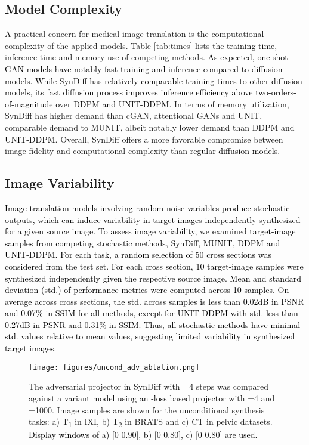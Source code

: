 \documentclass[journal,twoside,web]{ieeecolor}
\def\SB#1{\textsubscript{#1}}
\newcommand*{\revhl}{\textcolor{black}}
\begin{document}
\subsection{Model Complexity}
A practical concern for medical image translation is the computational complexity of the applied models. Table \ref{tab:times} lists the \revhl{training time,} inference time and memory use of competing methods. \revhl{As expected, one-shot GAN models have notably fast training and inference compared to diffusion models. While SynDiff has relatively comparable training times to other diffusion models, its fast diffusion process improves inference efficiency above two-orders-of-magnitude over DDPM and UNIT-DDPM.} In terms of memory utilization, SynDiff has higher demand than cGAN, attentional GANs and UNIT, comparable demand to MUNIT, albeit notably lower demand than DDPM \revhl{and UNIT-DDPM}. Overall, SynDiff offers a more favorable compromise between image fidelity and computational complexity than \revhl{regular diffusion models}.


\subsection{Image Variability}
\revhl{Image translation models involving random noise variables produce stochastic outputs, which can induce variability in target images independently synthesized for a given source image. To assess image variability, we examined target-image samples from competing stochastic methods, SynDiff, MUNIT, DDPM and UNIT-DDPM. For each task, a random selection of 50 cross sections was considered from the test set. For each cross section, 10 target-image samples were synthesized independently given the respective source image. Mean and standard deviation (std.) of performance metrics were computed across 10 samples. On average across cross sections, the std. across samples is less than 0.02dB in PSNR and 0.07\% in SSIM for all methods, except for UNIT-DDPM with std. less than 0.27dB in PSNR and 0.31\% in SSIM. Thus, all stochastic methods have minimal std. values relative to mean values, suggesting limited variability in synthesized target images.}



\begin{figure}[t]
\centering
\texttt{[image: figures/uncond\_adv\_ablation.png]}
\caption{The adversarial projector in SynDiff with =4 steps was compared against a \revhl{variant model using an -loss based projector} with =4 and =1000. Image samples are shown for the unconditional synthesis tasks: a) T\SB{1} in IXI, b) T\SB{2} in BRATS and c) CT in pelvic datasets. \revhl{Display windows of a) [0 0.90], b) [0 0.80], c) [0 0.80] are used.}}
\label{fig:l1proj}
\end{figure}
\end{document}
